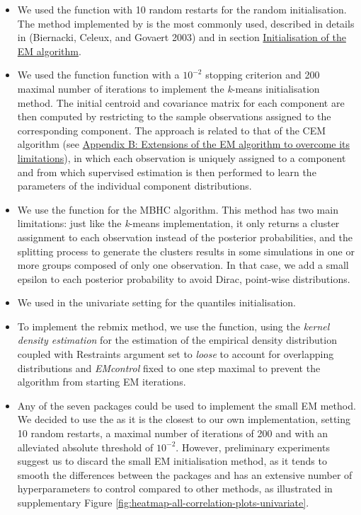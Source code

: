 \begin{itemize}
\item
  We used the function  with 10 random restarts for the random initialisation. The method implemented by  is the most commonly used, described in details in (Biernacki, Celeux, and Govaert 2003) and in section \protect\hyperlink{initialisation-of-the-em-algorithm}{Initialisation of the EM algorithm}.
\item
  We used the function  function with a \(10^{-2}\) stopping criterion and 200 maximal number of iterations to implement the \emph{k}-means initialisation method.
  The initial centroid and covariance matrix for each component are then computed by restricting to the sample observations assigned to the corresponding component. The approach is related to that of the CEM algorithm (see \protect\hyperlink{appendix-b-extensions-of-the-em-algorithm-to-overcome-its-limitations}{Appendix B: Extensions of the EM algorithm to overcome its limitations}), in which each observation is uniquely assigned to a component and from which supervised estimation is then performed to learn the parameters of the individual component distributions.
\item
  We use the  function for the MBHC algorithm. This method has two main limitations: just like the \emph{k}-means implementation, it only returns a cluster assignment to each observation instead of the posterior probabilities, and the splitting process to generate the clusters results in some simulations in one or more groups composed of only one observation. In that case, we add a small epsilon to each posterior probability to avoid Dirac, point-wise distributions.
\item
  We used in the univariate setting  for the quantiles initialisation.
\item
  To implement the rebmix method, we use the  function, using the \emph{kernel density estimation} for the estimation of the empirical density distribution coupled with Restraints argument set to \emph{loose} to account for overlapping distributions and \emph{EMcontrol} fixed to one step maximal to prevent the algorithm from starting EM iterations.
\item
  Any of the seven packages could be used to implement the small EM method. We decided to use the  as it is the closest to our own implementation, setting 10 random restarts, a maximal number of iterations of 200 and with an alleviated absolute threshold of \(10^{-2}\). However, preliminary experiments suggest us to discard the small EM
  initialisation method, as it tends to smooth the differences between the packages and has an extensive number of hyperparameters to control compared to other methods, as illustrated in supplementary Figure \ref{fig:heatmap-all-correlation-plots-univariate}.
\end{itemize}

